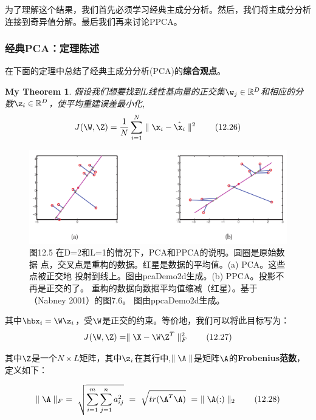\documentclass[a4paper]{article}
\begin{document}
为了理解这个结果，我们首先必须学习经典主成分分析。然后，我们将主成分分析连接到奇异值分解。最后我们再来讨论PPCA。 
\subsubsection{经典PCA：定理陈述 }

在下面的定理中总结了经典主成分分析(PCA)的\textbf{综合观点}。 

\newtheorem{mythm}{My Theorem}[subsection]
\begin{mythm}\label{thm:light}
	假设我们想要找到$L$线性基向量的正交集$\w_j\in\mathbb{R}^D$和相应的分数$\z_i\in\mathbb{R}^D$，使平均重建误差最小化,
\begin{equation}
	J(\W,\Z)=\frac{1}{N}\sum_{i=1}^{N}\parallel\x_i-\hat{\x_i}\parallel^2\tag{12.26}
\end{equation}
\end{mythm}

\begin{figure}[h]
	\centering
	\includegraphics[width=1\linewidth]{fig/figure5}
	\caption*{图12.5 在D=2和L=1的情况下，PCA和PPCA的说明。圆圈是原始数据
		点，交叉点是重构的数据。红星是数据的平均值。(a) PCA。这些点被正交地
		投射到线上。图由pcaDemo2d生成。(b) PPCA。投影不再是正交的了。
		重构的数据向数据平均值缩减（红星）。基于（Nabney 2001）的图7.6。
		图由ppcaDemo2d生成。}
\end{figure}

其中$\hbx_i=\W\z_i$，受$\W$是正交的约束。等价地，我们可以将此目标写为： 
\begin{equation}
		J(\W,\Z)=\parallel\X-\W\Z^T\parallel_F^2\tag{12.27}
\end{equation}

其中$\Z$是一个$N \times L$矩阵，其中$\z_i$在其行中,$\parallel\A\parallel$是矩阵$\A$的\textbf{Frobenius范数}，定义如下：

\begin{equation}
	\parallel\A\parallel_F \ =\  \sqrt{\sum_{i=1}^{m}\sum_{j=1}^{n}a_{ij}^2}\ =\ \sqrt{tr(\A^T\A)}\ =\ \parallel\A(:)\parallel_2 \tag{12.28}
\end{equation}
\end{document}
